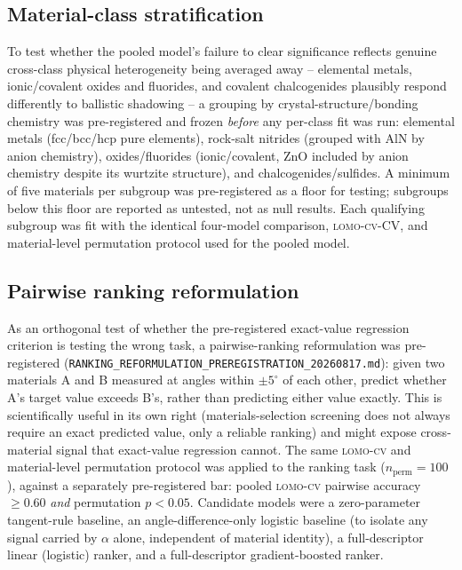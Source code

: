 \documentclass[aip,amsmath,amssymb,reprint]{revtex4-1}
\newcommand{\lomo}{\textsc{lomo-cv}}
\begin{document}
\subsection{Material-class stratification}
\label{ssec:stratification_method}

To test whether the pooled model's failure to clear significance
reflects genuine cross-class physical heterogeneity being averaged
away -- elemental metals, ionic/covalent oxides and fluorides, and
covalent chalcogenides plausibly respond differently to ballistic
shadowing -- a grouping by crystal-structure/bonding chemistry was
pre-registered and frozen \emph{before} any per-class fit was run:
elemental metals (fcc/bcc/hcp pure elements), rock-salt nitrides
(grouped with AlN by anion chemistry), oxides/fluorides
(ionic/covalent, ZnO included by anion chemistry despite its wurtzite
structure), and chalcogenides/sulfides. A minimum of five materials
per subgroup was pre-registered as a floor for testing; subgroups
below this floor are reported as untested, not as null results. Each
qualifying subgroup was fit with the identical four-model comparison,
\lomo{}-CV, and material-level permutation protocol used for the
pooled model.

\subsection{Pairwise ranking reformulation}
\label{ssec:ranking_method}

As an orthogonal test of whether the pre-registered exact-value
regression criterion is testing the wrong task, a pairwise-ranking
reformulation was pre-registered
(\texttt{RANKING\_REFORMULATION\_PREREGISTRATION\_20260817.md}): given
two materials A and B measured at angles within $\pm 5^{\circ}$ of
each other, predict whether A's target value exceeds B's, rather than
predicting either value exactly. This is scientifically useful in its
own right (materials-selection screening does not always require an
exact predicted value, only a reliable ranking) and might expose
cross-material signal that exact-value regression cannot. The same
\lomo{} and material-level permutation protocol was applied to the
ranking task ($n_{\mathrm{perm}}=100$), against a separately
pre-registered bar: pooled \lomo{} pairwise accuracy $\geq 0.60$
\emph{and} permutation $p<0.05$. Candidate models were a zero-parameter
tangent-rule baseline, an angle-difference-only logistic baseline (to
isolate any signal carried by $\alpha$ alone, independent of material
identity), a full-descriptor linear (logistic) ranker, and a
full-descriptor gradient-boosted ranker.
\end{document}
